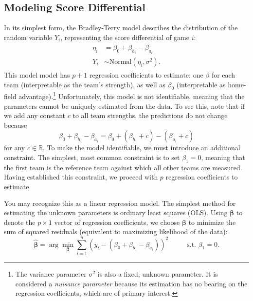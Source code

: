 \documentclass{article}
\begin{document}
  \subsection{\sc Modeling Score Differential}

  In its simplest form, the Bradley-Terry model describes the distribution of the random variable $Y_i$, representing the score differential of game $i$:
  \begin{align}
    \label{eqn-linear-regression}
    \begin{split}
      \eta_i &= \beta_0 + \beta_{h_i} - \beta_{a_i}\\
      Y_i &\sim \mbox{Normal}(\eta_i, \sigma^2).
    \end{split}
  \end{align}
  This model model has $p + 1$ regression coefficients to estimate: one $\beta$ for each team (interpretable as the team's strength), as well as $\beta_0$ (interpretable as home-field advantage).\footnote{The variance parameter $\sigma^2$ is also a fixed, unknown parameter. It is considered a {\it nuisance parameter} because its estimation has no bearing on the regression coefficients, which are of primary interest.} Unfortunately, this model is not identifiable, meaning that the parameters cannot be uniquely estimated from the data. To see this, note that if we add any constant $c$ to all team strengths, the predictions do not change because
  \begin{equation*}
    \beta_0 + \beta_{h_i} - \beta_{a_i} = \beta_0 + (\beta_{h_i} + c) - (\beta_{a_i} + c)
  \end{equation*}
  for any $c \in \mathbb{R}$. To make the model identifiable, we must introduce an additional constraint. The simplest, most common constraint is to set $\beta_1 = 0$, meaning that the first team is the reference team against which all other teams are measured. Having established this constraint, we proceed with $p$ regression coefficients to estimate.
  
  You may recognize this as a linear regression model. The simplest method for estimating the unknown parameters is ordinary least squares (OLS). Using $\boldsymbol{\beta}$ to denote the $p \times 1$ vector of regression coefficients, we choose $\boldsymbol{\beta}$ to minimize the sum of squared residuals (equivalent to maximizing likelihood of the data):
  \begin{equation}
    \label{eqn-least-squares}
    \boldsymbol{\hat\beta} = \arg\min_{\boldsymbol{\beta}} \sum_{i=1}^n (y_i - (\beta_0 + \beta_{h_i} - \beta_{a_i}))^2 \hspace{1cm} \mbox{ s.t. } \beta_1 = 0.
  \end{equation}
\end{document}
